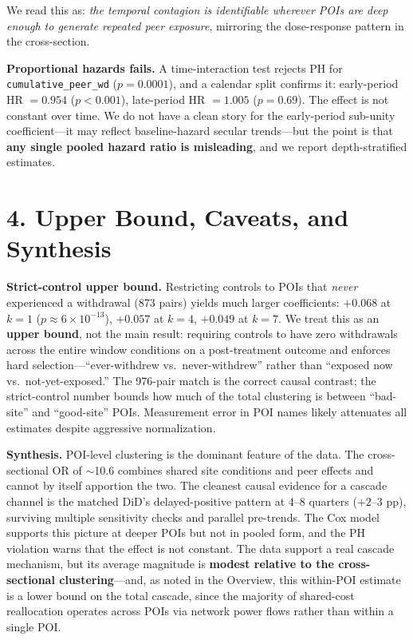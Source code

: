 \documentclass[10pt,letterpaper]{article}
\begin{document}
We read this as: \emph{the temporal contagion is identifiable wherever POIs are deep enough to generate repeated peer exposure}, mirroring the dose-response pattern in the cross-section.

\textbf{Proportional hazards fails.} A time-interaction test rejects PH for \texttt{cumulative\_peer\_wd} ($p = 0.0001$), and a calendar split confirms it: early-period HR $= 0.954$ ($p < 0.001$), late-period HR $= 1.005$ ($p = 0.69$). The effect is not constant over time. We do not have a clean story for the early-period sub-unity coefficient---it may reflect baseline-hazard secular trends---but the point is that \textbf{any single pooled hazard ratio is misleading}, and we report depth-stratified estimates.

\section*{4. Upper Bound, Caveats, and Synthesis}

\textbf{Strict-control upper bound.} Restricting controls to POIs that \emph{never} experienced a withdrawal (873 pairs) yields much larger coefficients: $+0.068$ at $k = 1$ ($p \approx 6\times 10^{-13}$), $+0.057$ at $k = 4$, $+0.049$ at $k = 7$. We treat this as an \textbf{upper bound}, not the main result: requiring controls to have zero withdrawals across the entire window conditions on a post-treatment outcome and enforces hard selection---``ever-withdrew vs.\ never-withdrew'' rather than ``exposed now vs.\ not-yet-exposed.'' The 976-pair match is the correct causal contrast; the strict-control number bounds how much of the total clustering is between ``bad-site'' and ``good-site'' POIs. Measurement error in POI names likely attenuates all estimates despite aggressive normalization.

\textbf{Synthesis.} POI-level clustering is the dominant feature of the data. The cross-sectional OR of ${\sim}$10.6 combines shared site conditions and peer effects and cannot by itself apportion the two. The cleanest causal evidence for a cascade channel is the matched DiD's delayed-positive pattern at 4--8 quarters ($+2$--$3$ pp), surviving multiple sensitivity checks and parallel pre-trends. The Cox model supports this picture at deeper POIs but not in pooled form, and the PH violation warns that the effect is not constant. The data support a real cascade mechanism, but its average magnitude is \textbf{modest relative to the cross-sectional clustering}---and, as noted in the Overview, this within-POI estimate is a lower bound on the total cascade, since the majority of shared-cost reallocation operates across POIs via network power flows rather than within a single POI.
\end{document}
